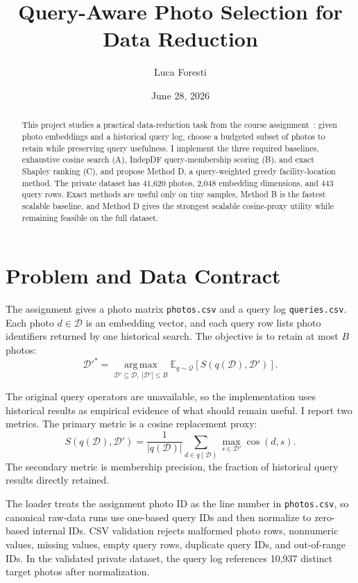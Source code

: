 \documentclass[sigconf,nonacm]{acmart}
\title[Query-Aware Photo Selection]{Query-Aware Photo Selection for Data Reduction}
\author{Luca Foresti}
\affiliation{%
  \institution{Roma Tre University}
  \city{Rome}
  \country{Italy}
}
\date{June 28, 2026}
\newcommand{\dataset}{\mathcal{D}}
\newcommand{\retained}{\mathcal{D}'}
\newcommand{\queries}{\mathcal{Q}}
\newcommand{\budget}{B}
\newcommand{\cosim}{\operatorname{cos}}
\newcommand{\argmax}{\operatorname*{arg\,max}}
\begin{document}
\begin{abstract}
This project studies a practical data-reduction task from the course assignment~\cite{velegrakis2026practical}: given photo embeddings and a historical query log, choose a budgeted subset of photos to retain while preserving query usefulness. I implement the three required baselines, exhaustive cosine search (A), IndepDF query-membership scoring (B), and exact Shapley ranking (C), and propose Method D, a query-weighted greedy facility-location method. The private dataset has 41,620 photos, 2,048 embedding dimensions, and 443 query rows. Exact methods are useful only on tiny samples, Method B is the fastest scalable baseline, and Method D gives the strongest scalable cosine-proxy utility while remaining feasible on the full dataset.
\end{abstract}

\maketitle

\section{Problem and Data Contract}

The assignment gives a photo matrix \texttt{photos.csv} and a query log \texttt{queries.csv}. Each photo $d \in \dataset$ is an embedding vector, and each query row lists photo identifiers returned by one historical search. The objective is to retain at most $\budget$ photos:
\begin{equation}
  \retained^{*} =
  \argmax_{\retained \subseteq \dataset,\ |\retained| \leq \budget}
  \mathbb{E}_{q \sim \queries}\left[S(q(\dataset), \retained)\right].
  \label{eq:main-objective}
\end{equation}

The original query operators are unavailable, so the implementation uses historical results as empirical evidence of what should remain useful. I report two metrics. The primary metric is a cosine replacement proxy:
\begin{equation}
  S(q(\dataset), \retained)
  =
  \frac{1}{|q(\dataset)|}
  \sum_{d \in q(\dataset)}
  \max_{s \in \retained} \cosim(d, s).
  \label{eq:cosine-proxy}
\end{equation}
The secondary metric is membership precision, the fraction of historical query results directly retained.

The loader treats the assignment photo ID as the line number in \texttt{photos.csv}, so canonical raw-data runs use one-based query IDs and then normalize to zero-based internal IDs. CSV validation rejects malformed photo rows, nonnumeric values, missing values, empty query rows, duplicate query IDs, and out-of-range IDs. In the validated private dataset, the query log references 10,937 distinct target photos after normalization.
\end{document}
